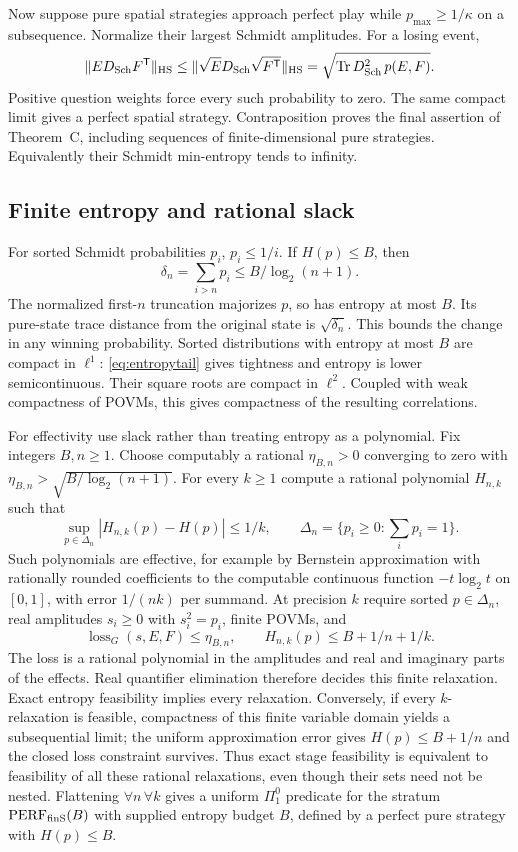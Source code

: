 Now suppose pure spatial strategies approach perfect play while $p_{\max}\geq1/\kappa$ on a subsequence. Normalize their largest Schmidt amplitudes. For a losing event,
\[
 \|ED_{\rm Sch}F^{\mathsf T}\|_{\rm HS}
 \leq\|\sqrt E D_{\rm Sch}\sqrt{F^{\mathsf T}}\|_{\rm HS}
 =\sqrt{\operatorname{Tr} D_{\rm Sch}^2\,p(E,F)}.
\]
Positive question weights force every such probability to zero. The same compact limit gives a perfect spatial strategy. Contraposition proves the final assertion of Theorem~C, including sequences of finite-dimensional pure strategies. Equivalently their Schmidt min-entropy tends to infinity.

\subsection{Finite entropy and rational slack}
For sorted Schmidt probabilities $p_i$, $p_i\leq1/i$. If $H(p)\leq B$, then
\begin{equation}\label{eq:entropytail}
 \delta_n=\sum_{i>n}p_i\leq B/\log_2(n+1).
\end{equation}
The normalized first-$n$ truncation majorizes $p$, so has entropy at most $B$. Its pure-state trace distance from the original state is $\sqrt{\delta_n}$. This bounds the change in any winning probability. Sorted distributions with entropy at most $B$ are compact in $\ell^1$: \eqref{eq:entropytail} gives tightness and entropy is lower semicontinuous. Their square roots are compact in $\ell^2$. Coupled with weak compactness of POVMs, this gives compactness of the resulting correlations.

For effectivity use slack rather than treating entropy as a polynomial.
Fix integers $B,n\geq1$. Choose computably a rational $\eta_{B,n}>0$
converging to zero with
$\eta_{B,n}>\sqrt{B/\log_2(n+1)}$.
For every $k\geq1$ compute a rational polynomial $H_{n,k}$ such that
\[
 \sup_{p\in\Delta_n}|H_{n,k}(p)-H(p)|\leq1/k,
 \qquad \Delta_n=\{p_i\geq0:\sum_i p_i=1\}.
\]
Such polynomials are effective, for example by Bernstein approximation with rationally rounded coefficients to
the computable continuous function $-t\log_2t$ on $[0,1]$, with error
$1/(nk)$ per summand. At precision $k$ require sorted $p\in\Delta_n$,
real amplitudes $s_i\geq0$ with $s_i^2=p_i$, finite POVMs, and
\[
 \operatorname{loss}_G(s,E,F)\leq\eta_{B,n},\qquad
 H_{n,k}(p)\leq B+1/n+1/k.
\]
The loss is a rational polynomial in the amplitudes and real and imaginary
parts of the effects. Real quantifier elimination therefore decides this
finite relaxation. Exact entropy feasibility implies every relaxation.
Conversely, if every $k$-relaxation is feasible, compactness of this finite
variable domain yields a subsequential limit; the uniform approximation
error gives $H(p)\leq B+1/n$ and the closed loss constraint survives.
Thus exact stage feasibility is equivalent to feasibility of all these
rational relaxations, even though their sets need not be nested.
Flattening $\forall n\,\forall k$ gives a uniform $\Pi^0_1$ predicate
for the stratum $\mathrm{PERF}_{\mathrm{finS}}(B)$ with supplied entropy budget $B$, defined by a perfect pure strategy with $H(p)\leq B$.

